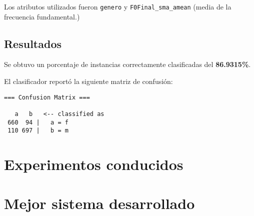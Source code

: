 \documentclass[10pt,a4paper]{article}
\begin{document}
Los atributos utilizados fueron \texttt{genero} y \texttt{F0Final\_sma\_amean} (media de la frecuencia fundamental.)

\subsection{Resultados}

Se obtuvo un porcentaje de instancias correctamente clasificadas del \textbf{86.9315\%}.

El clasificador reportó la siguiente matriz de confusión:

\begin{verbatim}
=== Confusion Matrix ===

   a   b   <-- classified as
 660  94 |   a = f
 110 697 |   b = m
\end{verbatim}

\section{Experimentos conducidos}

\lipsum[1-2]

\section{Mejor sistema desarrollado}

\lipsum[3-4]
\end{document}
